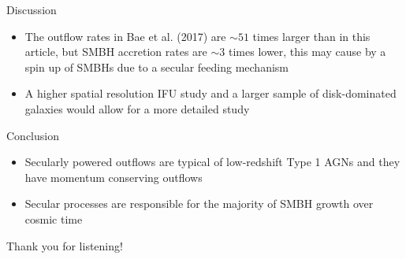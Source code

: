 \documentclass{beamer}
\begin{document}
\begin{frame}{Discussion}
    \begin{itemize}
        \item[\bullet] The outflow rates in Bae et al. (2017) are $\sim51$ times larger than in this article, but SMBH accretion rates are $\sim3$ times lower, this may cause by a spin up of SMBHs due to a secular feeding mechanism

        \item[\bullet] A higher spatial resolution IFU study and a larger sample of disk-dominated galaxies would allow for a more detailed study
    \end{itemize}
\end{frame}

\begin{frame}{Conclusion}
    \begin{itemize}
        \item[\bullet] Secularly powered outflows are typical of low-redshift Type 1 AGNs and they have momentum conserving outflows

        \item[\bullet] Secular processes are responsible for the majority of SMBH growth over cosmic time
    \end{itemize}
\end{frame}

\begin{frame}
    \begin{center}
        \Huge Thank you for listening!
    \end{center}
\end{frame}
\end{document}
